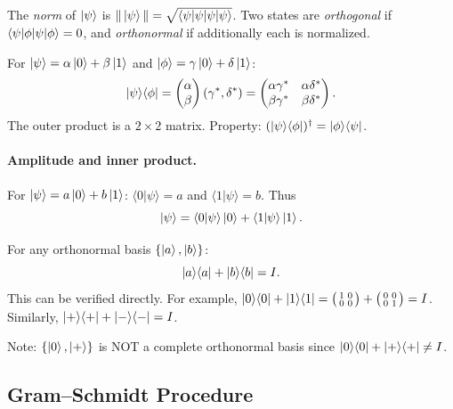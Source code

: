 \documentclass[10pt,a4paper]{article}
\begin{document}
The \emph{norm} of $\ket{\psi}$ is $\|\ket{\psi}\|=\sqrt{\braket{\psi|\psi}}$. Two states are \emph{orthogonal} if $\braket{\psi|\phi}=0$, and \emph{orthonormal} if additionally each is normalized.

\begin{tcolorbox}[defstyle, title={Definition: Outer Product}]
For $\ket{\psi}=\alpha\ket{0}+\beta\ket{1}$ and $\ket{\phi}=\gamma\ket{0}+\delta\ket{1}$:
\[
\ket{\psi}\!\bra{\phi} = \begin{pmatrix}\alpha\\\beta\end{pmatrix}(\gamma^*,\delta^*) = \begin{pmatrix}\alpha\gamma^* & \alpha\delta^* \\ \beta\gamma^* & \beta\delta^*\end{pmatrix}.
\]
The outer product is a $2\times 2$ matrix. Property: $(\ket{\psi}\!\bra{\phi})^\dagger = \ket{\phi}\!\bra{\psi}$.
\end{tcolorbox}

\paragraph{Amplitude and inner product.}
For $\ket{\psi}=a\ket{0}+b\ket{1}$:
$\langle 0|\psi\rangle=a$ and $\langle 1|\psi\rangle=b$.
Thus
\[
\ket{\psi}
=
\langle 0|\psi\rangle\ket{0}
+
\langle 1|\psi\rangle\ket{1}.
\]

\begin{tcolorbox}[propstyle, title={Completeness Relation}]
For any orthonormal basis $\{\ket{a},\ket{b}\}$:
\[
\ket{a}\!\bra{a} + \ket{b}\!\bra{b} = I.
\]
This can be verified directly. For example, $\ket{0}\!\bra{0}+\ket{1}\!\bra{1}=\bigl(\begin{smallmatrix}1&0\\0&0\end{smallmatrix}\bigr)+\bigl(\begin{smallmatrix}0&0\\0&1\end{smallmatrix}\bigr)=I$. Similarly, $\ket{+}\!\bra{+}+\ket{-}\!\bra{-}=I$.

Note: $\{\ket{0},\ket{+}\}$ is NOT a complete orthonormal basis since $\ket{0}\!\bra{0}+\ket{+}\!\bra{+}\neq I$.
\end{tcolorbox}

\subsection{Gram--Schmidt Procedure}
\end{document}
